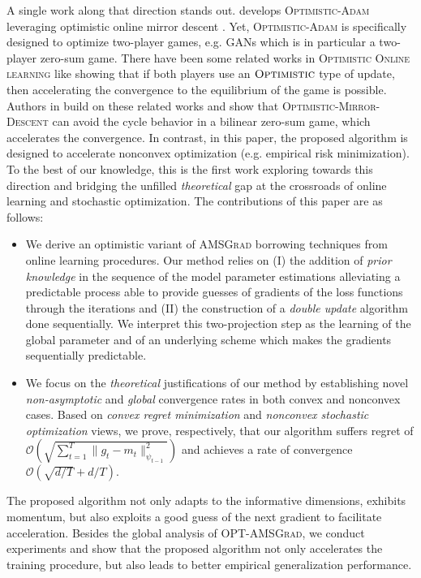 \documentclass[11pt]{article}
\theoremstyle{k}
\begin{document}
A single work along that direction stands out. \citep{DISZ18} develops \textsc{Optimistic-Adam} leveraging optimistic online mirror descent \citep{RS13b}.
Yet, \textsc{Optimistic-Adam} is specifically designed to optimize two-player games, e.g. GANs \citep{goodfellow2014generative} which is in particular a two-player zero-sum game. There have been some related works in \textsc{Optimistic Online learning} like \citep{CJ12,RS13b,SALS15} showing that if both players use an $\textsc{Optimistic}$ type of update, then accelerating the convergence to the equilibrium of the game is possible.
Authors in \citep{DISZ18} build on these related works and show that \textsc{Optimistic-Mirror-Descent} can avoid the cycle behavior in a bilinear zero-sum game, which accelerates the convergence. 
In contrast, in this paper, the proposed algorithm is designed to accelerate nonconvex optimization (e.g. empirical risk minimization).
To the best of our knowledge, this is the first work exploring towards this direction and bridging the unfilled \emph{theoretical} gap at the crossroads of online learning and stochastic optimization.
The contributions of this paper are as follows:
\begin{itemize}
\item We derive an optimistic variant of \textsc{AMSGrad} borrowing techniques from online learning procedures. Our method relies on \textsf{(I)} the addition of \emph{prior knowledge} in the sequence of the model parameter estimations alleviating a predictable process able to provide guesses of gradients of the loss functions through the iterations and \textsf{(II)} the construction of a \emph{double update} algorithm done sequentially. We interpret this two-projection step as the learning of the global parameter and of an underlying scheme which makes the gradients sequentially predictable.
\item We focus on the  \emph{theoretical} justifications of our method by establishing novel \emph{non-asymptotic} and \emph{global} convergence rates in both convex and nonconvex cases.  Based on \emph{convex regret minimization} and \emph{nonconvex stochastic optimization} views, we prove, respectively, that our algorithm suffers regret of $\mathcal{O}\left(\sqrt{\sum_{t=1}^T \| g_t - m_t  \|^2_{\psi_{t-1}}}\right)$ and achieves a rate of convergence $\mathcal{O}\left(\sqrt{d/T} +d/T \right)$.
\end{itemize}
The proposed algorithm not only adapts to the informative dimensions, exhibits momentum, but also exploits a good guess of the next gradient to facilitate acceleration. 
Besides the global analysis of \textsc{OPT-AMSGrad}, we conduct experiments and show that the proposed algorithm not only accelerates the training procedure, but also leads to better empirical generalization performance.
\end{document}
